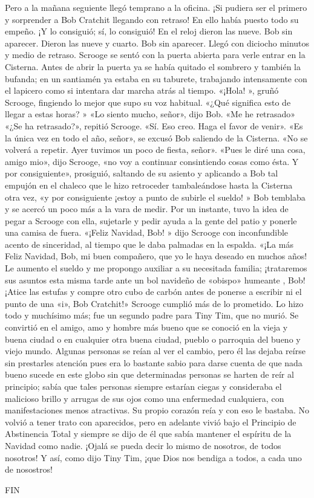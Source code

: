 \documentclass{novela}
\begin{document}
 Pero a la mañana seguiente llegó temprano a la oficina. ¡Si pudiera ser el primero y sorprender a Bob Cratchit llegando con retraso! En ello había puesto todo su empeño.
 ¡Y lo consiguió; sí, lo consiguió! En el reloj dieron las nueve. Bob sin aparecer. Dieron las nueve y cuarto. Bob sin aparecer. Llegó con diciocho minutos y medio de retraso. Scrooge se sentó con la puerta abierta para verle entrar en la Cisterna.
 Antes de abrir la puerta ya se había quitado el sombrero y también la bufanda; en un santiamén ya estaba en su taburete, trabajando intensamente con el lapicero como si intentara dar marcha atrás al tiempo.
 «¡Hola! », gruñó Scrooge, fingiendo lo mejor que supo su voz habitual. «¿Qué significa esto de llegar a estas horas? »
 «Lo siento mucho, señor», dijo Bob. «Me he retrasado» «¿Se ha retrasado?», repitió Scrooge. «Sí. Eso creo. Haga el favor de venir».
 «Es la única vez en todo el año, señor», se excusó Bob saliendo de la Cisterna. «No se volverá a repetir. Ayer tuvimos un poco de fiesta, señor».
 «Pues le diré una cosa, amigo mio», dijo Scrooge, «no voy a continuar consintiendo cosas como ésta. Y por consiguiente», prosiguió, saltando de su asiento y aplicando a Bob tal empujón en el chaleco que le hizo retroceder tambaleándose hasta la Cisterna otra vez, «y por consiguiente ¡estoy a punto de subirle el sueldo! »
 Bob temblaba y se acercó un poco más a la vara de medir. Por un instante, tuvo la idea de pegar a Scrooge con ella, sujetarle y pedir ayuda a la gente del patio y ponerle una camisa de fuera.
 «¡Feliz Navidad, Bob! » dijo Scrooge con inconfundible acento de sinceridad, al tiempo que le daba palmadas en la espalda. «¡La más Feliz Navidad, Bob, mi buen compañero, que yo le haya deseado en muchos años! Le aumento el sueldo y me propongo auxiliar a su necesitada familia; ¡trataremos sus asuntos esta misma tarde ante un bol navideño de «obispo» humeante , Bob! ¡Atice las estufas y compre otro cubo de carbón antes de ponerse a escribir ni el punto de una «i», Bob Cratchit!»
 Scrooge cumplió más de lo prometido. Lo hizo todo y muchísimo más; fue un segundo padre para Tiny Tim, que no murió. Se convirtió en el amigo, amo y hombre más bueno que se conoció en la vieja y buena ciudad o en cualquier otra buena ciudad, pueblo o parroquia del bueno y viejo mundo. Algunas personas se reían al ver el cambio, pero él las dejaba reírse sin prestarles atención pues era lo bastante sabio para darse cuenta de que nada bueno sucede en este globo sin que determinadas personas se harten de reír al principio; sabía que tales personas siempre estarían ciegas y consideraba el malicioso brillo y arrugas de sus ojos como una enfermedad cualquiera, con manifestaciones menos atractivas. Su propio corazón reía y con eso le bastaba.
 No volvió a tener trato con aparecidos, pero en adelante vivió bajo el Principio de Abstinencia Total y siempre se dijo de él que sabía mantener el espíritu de la Navidad como nadie. ¡Ojalá se pueda decir lo mismo de nosotros, de todos nosotros! Y así, como dijo Tiny Tim, ¡que Dios nos bendiga a todos, a cada uno de nosostros!



 FIN
\end{document}
